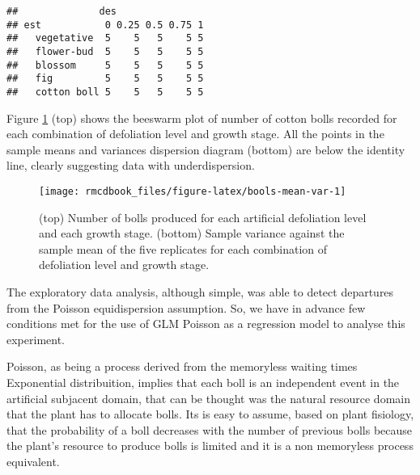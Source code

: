 \documentclass[9pt,a5paper,]{book}
\newenvironment{Shaded}{}{}
\newcommand{\KeywordTok}[1]{\textbf{{#1}}}
\newcommand{\DataTypeTok}[1]{\underline{{#1}}}
\newcommand{\StringTok}[1]{{#1}}
\newcommand{\NormalTok}[1]{{#1}}
\renewenvironment{Shaded}{\color{inputcolor}}{}
\renewcommand{\DataTypeTok}[1]{{#1}}
\theoremstyle{definition}
\theoremstyle{definition}
\theoremstyle{remark}
\begin{document}
\begin{Shaded}
\end{Shaded}

\begin{verbatim}
##              des
## est           0 0.25 0.5 0.75 1
##   vegetative  5    5   5    5 5
##   flower-bud  5    5   5    5 5
##   blossom     5    5   5    5 5
##   fig         5    5   5    5 5
##   cotton boll 5    5   5    5 5
\end{verbatim}

Figure \ref{fig:bools-mean-var} (top) shows the beeswarm plot of number
of cotton bolls recorded for each combination of defoliation level and
growth stage. All the points in the sample means and variances
dispersion diagram (bottom) are below the identity line, clearly
suggesting data with underdispersion.

\begin{figure}[h]

{\centering \texttt{[image: rmcdbook\_files/figure-latex/bools-mean-var-1]} 

}

\caption{(top) Number of bolls produced for each artificial defoliation level and each growth stage. (bottom) Sample variance against the sample mean of the five replicates for each combination of defoliation level and growth stage.}\label{fig:bools-mean-var}
\end{figure}

The exploratory data analysis, although simple, was able to detect
departures from the Poisson equidispersion assumption. So, we have in
advance few conditions met for the use of GLM Poisson as a regression
model to analyse this experiment.

Poisson, as being a process derived from the memoryless waiting times
Exponential distribuition, implies that each boll is an independent
event in the artificial subjacent domain, that can be thought was the
natural resource domain that the plant has to allocate bolls. Its is
easy to assume, based on plant fisiology, that the probability of a boll
decreases with the number of previous bolls because the plant's resource
to produce bolls is limited and it is a non memoryless process
equivalent.
\end{document}

